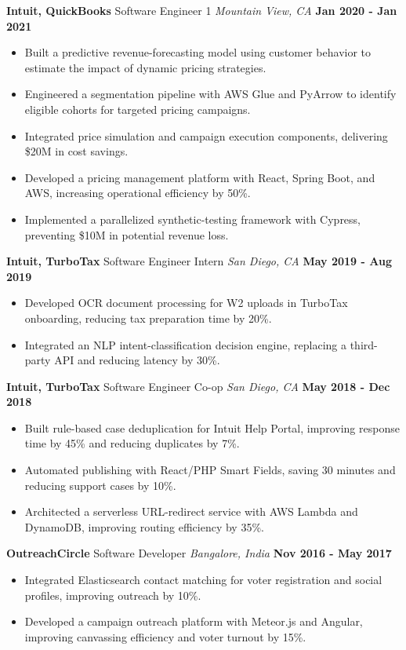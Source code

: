 \documentclass[10pt, letterpaper]{article}
\newcommand{\jobentry}[4]{
  \noindent\textbf{#1} \hfill #2 \hfill \textit{#3} \hfill \textbf{#4}
}
\begin{document}
\jobentry{Intuit, QuickBooks}{Software Engineer 1}{Mountain View, CA}{Jan 2020 - Jan 2021}
\begin{itemize}
\item Built a predictive revenue-forecasting model using customer behavior to estimate the impact of dynamic pricing strategies.
\item Engineered a segmentation pipeline with AWS Glue and PyArrow to identify eligible cohorts for targeted pricing campaigns.
\item Integrated price simulation and campaign execution components, delivering \$20M in cost savings.
\item Developed a pricing management platform with React, Spring Boot, and AWS, increasing operational efficiency by 50\%.
\item Implemented a parallelized synthetic-testing framework with Cypress, preventing \$10M in potential revenue loss.
\end{itemize}

\jobentry{Intuit, TurboTax}{Software Engineer Intern}{San Diego, CA}{May 2019 - Aug 2019}
\begin{itemize}
\item Developed OCR document processing for W2 uploads in TurboTax onboarding, reducing tax preparation time by 20\%.
\item Integrated an NLP intent-classification decision engine, replacing a third-party API and reducing latency by 30\%.
\end{itemize}

\jobentry{Intuit, TurboTax}{Software Engineer Co-op}{San Diego, CA}{May 2018 - Dec 2018}
\begin{itemize}
\item Built rule-based case deduplication for Intuit Help Portal, improving response time by 45\% and reducing duplicates by 7\%.
\item Automated publishing with React/PHP Smart Fields, saving 30 minutes and reducing support cases by 10\%.
\item Architected a serverless URL-redirect service with AWS Lambda and DynamoDB, improving routing efficiency by 35\%.
\end{itemize}

\jobentry{OutreachCircle}{Software Developer}{Bangalore, India}{Nov 2016 - May 2017}
\begin{itemize}
\item Integrated Elasticsearch contact matching for voter registration and social profiles, improving outreach by 10\%.
\item Developed a campaign outreach platform with Meteor.js and Angular, improving canvassing efficiency and voter turnout by 15\%.
\end{itemize}
\end{document}
